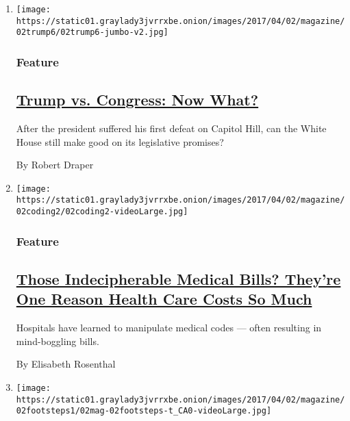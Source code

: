 \begin{enumerate}
\def\labelenumi{\arabic{enumi}.}
\item
  \texttt{[image: https://static01.graylady3jvrrxbe.onion/images/2017/04/02/magazine/02trump6/02trump6-jumbo-v2.jpg]}

  \hypertarget{feature}{%
  \subsubsection{Feature}\label{feature}}

  \hypertarget{trump-vs-congress-now-what}{%
  \subsection{\texorpdfstring{\href{/2017/03/26/magazine/trump-vs-congress-now-what.html}{Trump
  vs. Congress: Now
  What?}}{Trump vs. Congress: Now What?}}\label{trump-vs-congress-now-what}}

  After the president suffered his first defeat on Capitol Hill, can the
  White House still make good on its legislative promises?

  By Robert Draper
\item
  \texttt{[image: https://static01.graylady3jvrrxbe.onion/images/2017/04/02/magazine/02coding2/02coding2-videoLarge.jpg]}

  \hypertarget{feature-1}{%
  \subsubsection{Feature}\label{feature-1}}

  \hypertarget{those-indecipherable-medical-bills-theyre-one-reason-health-care-costs-so-much}{%
  \subsection{\texorpdfstring{\href{/2017/03/29/magazine/those-indecipherable-medical-bills-theyre-one-reason-health-care-costs-so-much.html}{Those
  Indecipherable Medical Bills? They're One Reason Health Care Costs So
  Much}}{Those Indecipherable Medical Bills? They're One Reason Health Care Costs So Much}}\label{those-indecipherable-medical-bills-theyre-one-reason-health-care-costs-so-much}}

  Hospitals have learned to manipulate medical codes --- often resulting
  in mind-boggling bills.

  By Elisabeth Rosenthal
\item
  \texttt{[image: https://static01.graylady3jvrrxbe.onion/images/2017/04/02/magazine/02footsteps1/02mag-02footsteps-t\_CA0-videoLarge.jpg]}


\end{enumerate}
